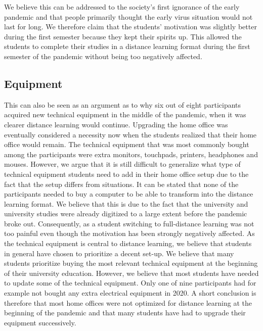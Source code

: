 \documentclass{sigchi}
\begin{document}
We believe this can be addressed to the society’s first ignorance of the early pandemic and that people primarily thought the early virus situation would not last for long. We therefore claim that the students' motivation was slightly better during the first semester because they kept their spirits up. This allowed the students to complete their studies in a distance learning format during the first semester of the pandemic without being too negatively affected.

\subsection{Equipment}
This can also be seen as an argument as to why six out of eight participants acquired new technical equipment in the middle of the pandemic, when it was clearer distance learning would continue. Upgrading the home office was eventually considered a necessity now when the students realized that their home office would remain. The technical equipment that was most commonly bought among the participants were extra monitors, touchpads, printers, headphones and mouses. However, we argue that it is still difficult to generalize what type of technical equipment students need to add in their home office setup due to the fact that the setup differs from situations. It can be stated that none of the participants needed to buy a computer to be able to transform into the distance learning format. We believe that this is due to the fact that the university and university studies were already digitized to a large extent before the pandemic broke out. Consequently, as a student switching to full-distance learning was not too painful even though the motivation has been strongly negatively affected. As the technical equipment is central to distance learning, we believe that students in general have chosen to prioritize a decent set-up. We believe that many students prioritize buying the most relevant technical equipment at the beginning of their university education. However, we believe that most students have needed to update some of the technical equipment. Only one of nine participants had for example not bought any extra electrical equipment in 2020. A short conclusion is therefore that most home offices were not optimized for distance learning at the beginning of the pandemic and that many students have had to upgrade their equipment successively.
\end{document}
